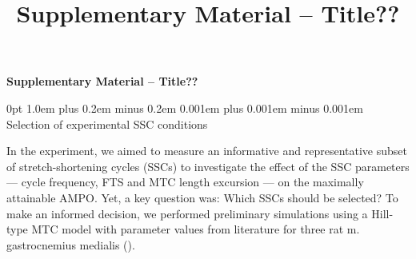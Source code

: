 \documentclass[
  11pt,
  a4paper]{article}
\title{Supplementary Material -- Title??}
\author{}
\date{}
\makeatletter
\renewcommand{\section}{%
  \@startsection{section}{1}
    {0pt} 					%
    {1.0em plus 0.2em minus 0.2em} 	%
    {0.001em plus 0.001em minus 0.001em}    	%
    {\Large\bfseries\sffamily}%
}
\makeatother
\begin{document}
\begin{titlepage}
\begin{titlepage}

\raggedright
{\sffamily\LARGE\bfseries\nohyphens{Supplementary Material --
Title??}}\\[2\baselineskip]


	
\vspace{0.5\baselineskip}


\vspace{1\baselineskip}


\vspace{1\baselineskip}


\vfill
\vspace{0.1\textheight}
\end{titlepage}\end{titlepage}

\linenumbers

\renewcommand{\thesection}{S\arabic{section}}
\setcounter{section}{0}


\section{Selection of experimental SSC
conditions}\label{selection-of-experimental-ssc-conditions}

In the experiment, we aimed to measure an informative and representative
subset of stretch-shortening cycles (SSCs) to investigate the effect of
the SSC parameters --- cycle frequency, FTS and MTC length excursion ---
on the maximally attainable AMPO. Yet, a key question was: Which SSCs
should be selected? To make an informed decision, we performed
preliminary simulations using a Hill-type MTC model with parameter
values from literature for three rat m. gastrocnemius medialis
().
\end{document}
